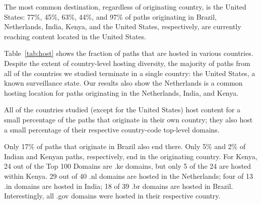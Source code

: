 \begin{finding}
The most common destination, regardless of originating country, is the United States:
77\%, 45\%, 63\%, 44\%, and 97\% of paths originating in Brazil, Netherlands, India,
Kenya,
and the United States, respectively, are currently reaching content located in the
United States.
\end{finding}
\noindent
Table~\ref{tab:host} shows the fraction of paths that are hosted in various
countries.  Despite the extent of country-level hosting diversity, the
majority of paths from all of the countries we studied terminate in a single
country: the United States, a known surveillance state.   Our results also
show the Netherlands is a common hosting location for paths originating in the
Netherlands, India, and Kenya.



\begin{finding}
All of the countries studied (except for the United States) host content for a small percentage of the paths that originate in their own country; they also host a small percentage of their respective country-code top-level domains.
\end{finding}
\noindent
Only 17\% of paths that originate in Brazil also end there.  Only 5\%
and 2\% of Indian and Kenyan paths, respectively, end in the originating
country.  
For Kenya, 24 out of the Top 100 Domains are .ke domains, but only 5
of the 24 are hosted within Kenya.  29 out of 40 .nl domains are hosted in the Netherlands;
four of 13 .in domains are hosted in India; 18 of 39 .br domains are hosted in Brazil.
Interestingly, all .gov domains were hosted in their respective country. 

